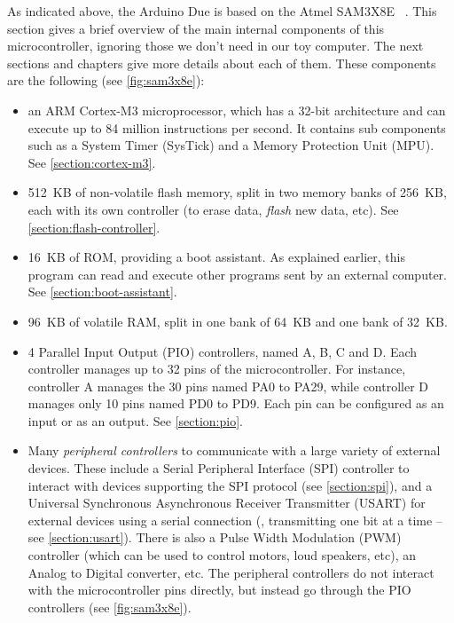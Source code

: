As indicated above, the Arduino Due is based on the Atmel SAM3X8E
~\cite{SAM3X8E}. This section gives a brief overview of the main
internal components of this microcontroller, ignoring those we don't need in
our toy computer. The next sections and chapters give more details about each
of them. These components are the following (see \cref{fig:sam3x8e}):
\begin{itemize}
	\item an ARM Cortex-M3 microprocessor, which has a 32-bit architecture and
	can execute up to 84 million instructions per second. It contains sub
	components such as a System Timer (SysTick) and a Memory Protection Unit
	(MPU). See \cref{section:cortex-m3}.

  \item 512~KB of non-volatile flash memory, split in two memory banks of
  256~KB, each with its own controller (to erase data, {\em flash} new data,
  etc). See \cref{section:flash-controller}.

  \item 16~KB of ROM, providing a boot assistant. As explained earlier, this
  program can read and execute other programs sent by an external computer. See
  \cref{section:boot-assistant}.

	\item 96~KB of volatile RAM, split in one bank of 64~KB and one bank of 32~KB.

  \item 4 Parallel Input Output (PIO) controllers, named A, B, C and D. Each
	controller manages up to 32 pins of the microcontroller. For instance,
	controller A manages the 30 pins named PA0 to PA29, while controller D
	manages only 10 pins named PD0 to PD9. Each pin can be configured as an input
	or as an output. See \cref{section:pio}.

  \item Many {\em peripheral controllers} to communicate with a large variety
	of external devices. These include a Serial Peripheral Interface (SPI)
	controller to interact with devices supporting the SPI protocol (see
	\cref{section:spi}), and a Universal Synchronous Asynchronous Receiver
	Transmitter (USART) for external devices using a serial connection (\ie,
	transmitting one bit at a time -- see \cref{section:usart}). There is also a
	Pulse Width Modulation (PWM) controller (which can be used to control motors,
	loud speakers, etc), an Analog to Digital converter, etc. The peripheral
	controllers do not interact with the microcontroller pins directly, but
	instead go through the PIO controllers (see \cref{fig:sam3x8e}).


\end{itemize}
